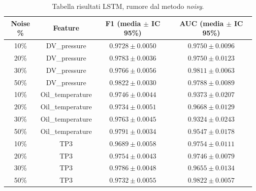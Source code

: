 \documentclass[../main.tex]{subfiles}
\begin{document}
\begin{table}[H]
\centering\small
{}
\begin{tabular}{cccc}
\toprule
\textbf{Noise \%} & \textbf{Feature} & \textbf{F1 (media $\pm$ IC 95\%)} & \textbf{AUC (media $\pm$ IC 95\%)} \\
\midrule
10\% & DV\_pressure     & $0.9728 \pm 0.0050$ & $0.9750 \pm 0.0096$ \\
20\% & DV\_pressure     & $0.9783 \pm 0.0036$ & $0.9750 \pm 0.0123$ \\
30\% & DV\_pressure     & $0.9766 \pm 0.0056$ & $0.9811 \pm 0.0063$ \\
50\% & DV\_pressure     & $0.9822 \pm 0.0030$ & $0.9788 \pm 0.0089$ \\
\midrule
10\% & Oil\_temperature & $0.9746 \pm 0.0044$ & $0.9373 \pm 0.0207$ \\
20\% & Oil\_temperature & $0.9734 \pm 0.0051$ & $0.9668 \pm 0.0129$ \\
30\% & Oil\_temperature & $0.9763 \pm 0.0045$ & $0.9324 \pm 0.0243$ \\
50\% & Oil\_temperature & $0.9791 \pm 0.0034$ & $0.9547 \pm 0.0178$ \\
\midrule
10\% & TP3             & $0.9689 \pm 0.0058$ & $0.9754 \pm 0.0111$ \\
20\% & TP3             & $0.9754 \pm 0.0043$ & $0.9746 \pm 0.0079$ \\
30\% & TP3             & $0.9786 \pm 0.0048$ & $0.9655 \pm 0.0134$ \\
50\% & TP3             & $0.9732 \pm 0.0055$ & $0.9822 \pm 0.0057$ \\
\bottomrule
\end{tabular}
\caption{Tabella risultati LSTM, rumore dal metodo \textit{noisy}.}
\label{tab:lstm_noisy}
\end{table}
\end{document}
